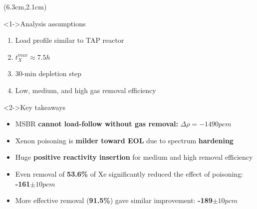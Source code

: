 \begin{frame}
\begin{columns}
	\column[t]{5.5cm}
	\begin{textblock*}{6.1cm}(6.3cm,2.1cm) %
	\begin{block}<1->{Analysis assumptions}
				\fontsize{7}{9}\selectfont
		\begin{enumerate}             
			\item Load profile similar to TAP reactor
			\item $t^{max}_X\approx7.5h$
			\item 30-min depletion step
			\item Low, medium, and high gas removal efficiency
		\end{enumerate}
		\vspace{-4mm}
	\end{block}

	\begin{block}<2->{Key takeaways}
				\fontsize{7}{9}\selectfont
		\begin{itemize}
			\item MSBR \textbf{cannot load-follow without gas removal:} 
			$\Delta\rho=-1490pcm$
			\item Xenon poisoning is \textbf{milder toward EOL} due to 
			spectrum \textbf{hardening}
			\item Huge \textbf{positive reactivity insertion} for medium 
			and high removal efficiency
			\item Even removal of \textbf{53.6\%} of Xe significantly 
			reduced the effect of poisoning: \textbf{-161$\pm10pcm$}
			\item More effective removal (\textbf{91.5\%}) gave similar 
			improvement: \textbf{-189$\pm10pcm$}
		\end{itemize}
		
	\end{block}
\end{textblock*}
\end{columns}
\end{frame}

